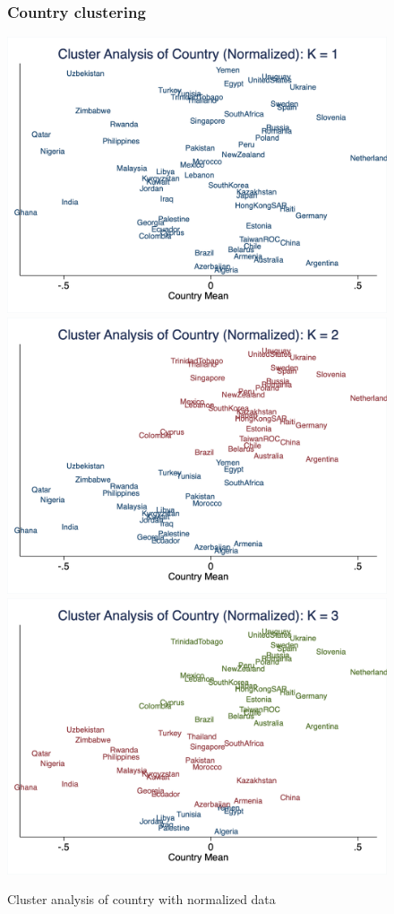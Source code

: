 \documentclass[10pt,leqno]{article}
\begin{document}
\begin{figure}  [h!]
\subsubsection{Country clustering}
\begin{center}
\caption{Cluster analysis of country with normalized data}
\includegraphics[scale=0.15]{CA_CountryK1_NOR.png}
\includegraphics[scale=0.15]{CA_CountryK2_NOR.png}
\includegraphics[scale=0.15]{CA_CountryK3_NOR.png}

\end{center}
\end{figure}
\end{document}
